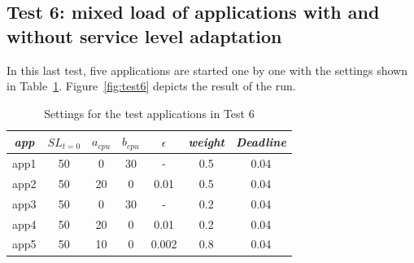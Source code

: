 \documentclass[nobiblatex]{LTHthesis}
\begin{document}
\subsection{Test 6: mixed load of applications with and without service 
  level adaptation}


In this last test, five applications are started one by one with the 
settings shown in Table~\ref{tab:settings_test6}. Figure~\ref{fig:test6}
depicts the result of the run.

\begin{table}[h]
  \centering
  \begin{tabular}{|c|c|c|c|c|c|c|}
  \hline 
   \emph{app} & $SL_{t=0}$ & \textbf{$a_{cpu}$} & 
   \textbf{$b_{cpu}$} & \textbf{$\epsilon$} & 
   \emph{weight} & \emph{Deadline} \\ \hline
  app1 & 50 & 0  & 30 & -     & 0.5 &0.04  \\ \hline
  app2 & 50 & 20 & 0  & 0.01  & 0.5 &0.04  \\ \hline
  app3 & 50 & 0  & 30 & -     & 0.2 &0.04  \\ \hline
  app4 & 50 & 20 & 0  & 0.01  & 0.2 &0.04  \\ \hline
  app5 & 50 & 10 & 0  & 0.002 & 0.8 &0.04  \\ \hline                
  \end{tabular}
  \caption{Settings for the test applications in Test 6}
  \label{tab:settings_test6}
\end{table}
\end{document}
